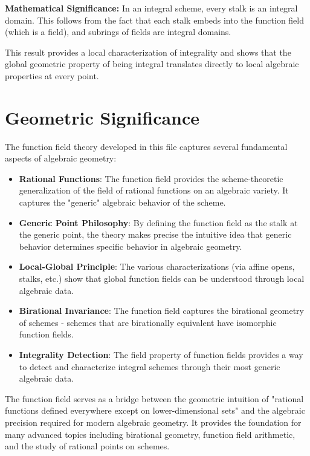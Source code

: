 \documentclass{article}
\theoremstyle{definition}
\begin{document}
\textbf{Mathematical Significance:} In an integral scheme, every stalk is an integral domain. This follows from the fact that each stalk embeds into the function field (which is a field), and subrings of fields are integral domains.

This result provides a local characterization of integrality and shows that the global geometric property of being integral translates directly to local algebraic properties at every point.

\section{Geometric Significance}

The function field theory developed in this file captures several fundamental aspects of algebraic geometry:

\begin{itemize}
\item \textbf{Rational Functions}: The function field provides the scheme-theoretic generalization of the field of rational functions on an algebraic variety. It captures the "generic" algebraic behavior of the scheme.

\item \textbf{Generic Point Philosophy}: By defining the function field as the stalk at the generic point, the theory makes precise the intuitive idea that generic behavior determines specific behavior in algebraic geometry.

\item \textbf{Local-Global Principle}: The various characterizations (via affine opens, stalks, etc.) show that global function fields can be understood through local algebraic data.

\item \textbf{Birational Invariance}: The function field captures the birational geometry of schemes - schemes that are birationally equivalent have isomorphic function fields.

\item \textbf{Integrality Detection}: The field property of function fields provides a way to detect and characterize integral schemes through their most generic algebraic data.
\end{itemize}

The function field serves as a bridge between the geometric intuition of "rational functions defined everywhere except on lower-dimensional sets" and the algebraic precision required for modern algebraic geometry. It provides the foundation for many advanced topics including birational geometry, function field arithmetic, and the study of rational points on schemes.
\end{document}
